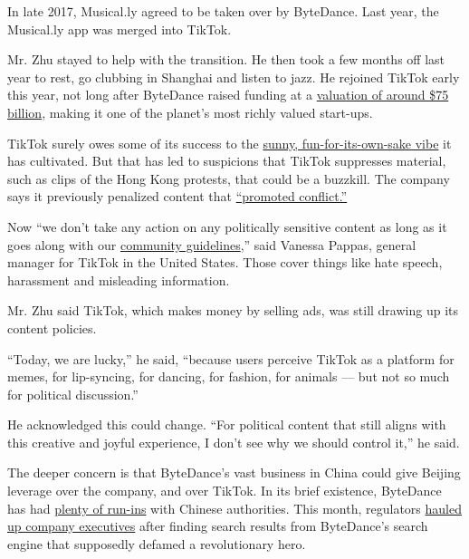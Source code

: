 In late 2017, Musical.ly agreed to be taken over by ByteDance. Last
year, the Musical.ly app was merged into TikTok.

Mr. Zhu stayed to help with the transition. He then took a few months
off last year to rest, go clubbing in Shanghai and listen to jazz. He
rejoined TikTok early this year, not long after ByteDance raised funding
at a
\href{https://www.nytimes3xbfgragh.onion/2018/09/28/technology/bytedance-fundraising-toutiao-tiktok.html}{valuation
of around \$75 billion}, making it one of the planet's most richly
valued start-ups.

TikTok surely owes some of its success to the
\href{https://www.nytimes3xbfgragh.onion/2018/12/03/technology/tiktok-a-chinese-video-app-brings-fun-back-to-social-media.html}{sunny,
fun-for-its-own-sake vibe} it has cultivated. But that has led to
suspicions that TikTok suppresses material, such as clips of the Hong
Kong protests, that could be a buzzkill. The company says it previously
penalized content that
\href{https://www.theguardian.com/technology/2019/sep/25/revealed-how-tiktok-censors-videos-that-do-not-please-beijing}{``promoted
conflict.''}

Now ``we don't take any action on any politically sensitive content as
long as it goes along with our
\href{https://support.tiktok.com/en/privacy-safety/community-policy-en}{community
guidelines},'' said Vanessa Pappas, general manager for TikTok in the
United States. Those cover things like hate speech, harassment and
misleading information.

Mr. Zhu said TikTok, which makes money by selling ads, was still drawing
up its content policies.

``Today, we are lucky,'' he said, ``because users perceive TikTok as a
platform for memes, for lip-syncing, for dancing, for fashion, for
animals --- but not so much for political discussion.''

He acknowledged this could change. ``For political content that still
aligns with this creative and joyful experience, I don't see why we
should control it,'' he said.

The deeper concern is that ByteDance's vast business in China could give
Beijing leverage over the company, and over TikTok. In its brief
existence, ByteDance has had
\href{https://www.nytimes3xbfgragh.onion/2018/04/12/business/china-bytedance-duanzi-censor.html}{plenty
of run-ins} with Chinese authorities. This month, regulators
\href{https://mp.weixin.qq.com/s/cNOmVWg4lagP5kTAlvoFHw}{hauled up
company executives} after finding search results from ByteDance's search
engine that supposedly defamed a revolutionary hero.

